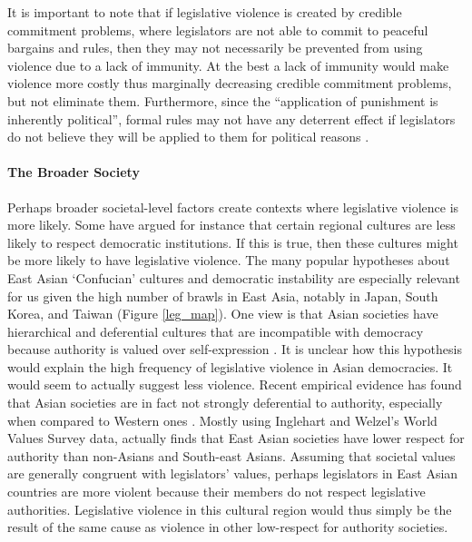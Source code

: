 \documentclass[a4paper]{article}\usepackage[]{graphicx}\usepackage[]{color}
\begin{document}
It is important to note that if legislative violence is created by credible commitment problems, where legislators are not able to commit to peaceful bargains and rules, then they may not necessarily be prevented from using violence due to a lack of immunity. At the best a lack of immunity would make violence more costly thus marginally decreasing credible commitment problems, but not eliminate them. Furthermore, since the ``application of punishment is inherently political'', formal rules may not have any deterrent effect if legislators do not believe they will be applied to them for political reasons \cite[58]{Wolfe2004}.

\paragraph{The Broader Society}

Perhaps broader societal-level factors create contexts where legislative violence is more likely. Some have argued for instance that certain regional cultures are less likely to respect democratic institutions. If this is true, then these cultures might be more likely to have legislative violence. The many popular hypotheses about East Asian `Confucian' cultures \citep[]{Inglehart2005, Inglehart2010} and democratic instability are especially relevant for us given the high number of brawls in East Asia, notably in Japan, South Korea, and Taiwan (Figure \ref{leg_map}). One view is that Asian societies have hierarchical and deferential cultures that are incompatible with democracy because authority is valued over self-expression \citep[212-213]{Dalton2005}. It is unclear how this hypothesis would explain the high frequency of legislative violence in Asian democracies. It would seem to actually suggest less violence. Recent empirical evidence has found that Asian societies are in fact not strongly deferential to authority, especially when compared to Western ones \citep{Dalton2005, KimAsianValues2010}. Mostly using Inglehart and Welzel's World Values Survey data, \cite{KimAsianValues2010} actually finds that East Asian societies have lower respect for authority than non-Asians and South-east Asians. Assuming that societal values are generally congruent with legislators' values, perhaps legislators in East Asian countries are more violent because their members do not respect legislative authorities. Legislative violence in this cultural region would thus simply be the result of the same cause as violence in other low-respect for authority societies.
\end{document}
